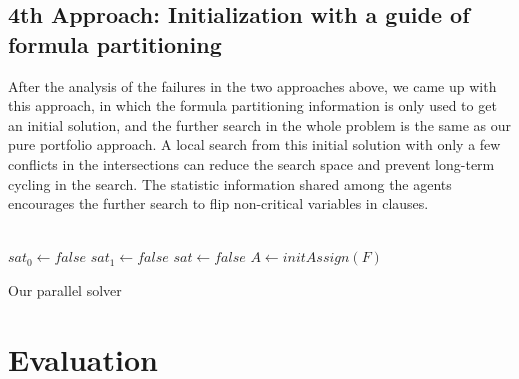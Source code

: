 \documentclass[12pt,a4paper,twoside]{scrartcl}
\numberwithin{equation}{section}
\begin{document}
\subsection{4th Approach: Initialization with a guide of formula partitioning}
After the analysis of the failures in the two approaches above, we came up with this approach, in which the formula partitioning information is only used to get an initial solution, and the further search in the whole problem is the same as our pure portfolio approach. A local search from this initial solution with only a few conflicts in the intersections can reduce the search space and prevent long-term cycling in the search. The statistic information shared among the agents encourages the further search to flip non-critical variables in clauses. \\
\\
\begin{algorithm}[H]
  $sat_0 \leftarrow false$\;
  $sat_1 \leftarrow false$\;
  $sat \leftarrow false$\;
  $A \leftarrow initAssign(F)$\;
 \caption{Our parallel solver}
\end{algorithm}  



\clearpage
\section{Evaluation} 
\label{sec:eva}
\end{document}
